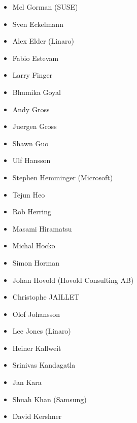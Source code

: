 \documentclass[a4paper,8pt,english]{sphinxmanual}
\begin{document}
\begin{itemize}
\item {} 
Mel Gorman (SUSE)

\item {} 
Sven Eckelmann

\item {} 
Alex Elder (Linaro)

\item {} 
Fabio Estevam

\item {} 
Larry Finger

\item {} 
Bhumika Goyal

\item {} 
Andy Gross

\item {} 
Juergen Gross

\item {} 
Shawn Guo

\item {} 
Ulf Hansson

\item {} 
Stephen Hemminger (Microsoft)

\item {} 
Tejun Heo

\item {} 
Rob Herring

\item {} 
Masami Hiramatsu

\item {} 
Michal Hocko

\item {} 
Simon Horman

\item {} 
Johan Hovold (Hovold Consulting AB)

\item {} 
Christophe JAILLET

\item {} 
Olof Johansson

\item {} 
Lee Jones (Linaro)

\item {} 
Heiner Kallweit

\item {} 
Srinivas Kandagatla

\item {} 
Jan Kara

\item {} 
Shuah Khan (Samsung)

\item {} 
David Kershner


\end{itemize}
\end{document}
